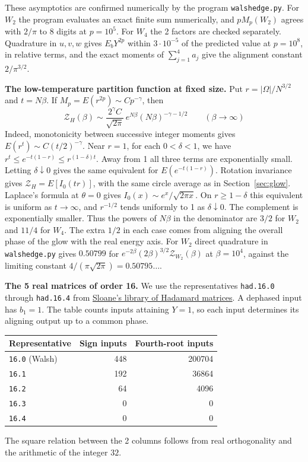 \documentclass[11pt,a4paper]{article}
\theoremstyle{remark}
\begin{document}
These asymptotics are confirmed numerically by the program
\texttt{walshedge.py}. For $W_2$ the program evaluates an exact finite sum numerically, and
$pM_p(W_2)$ agrees with $2/\pi$ to 8 digits at $p=10^5$. For $W_4$ the 2
factors are checked separately. Quadrature in $u,v,w$ gives
$E_bY^{2p}$ within $3\cdot10^{-5}$ of the predicted value at $p=10^8$, in
relative terms, and the exact moments of $\sum_{j=1}^4a_j$ give the
alignment constant $2/\pi^{3/2}$.

\medskip
\noindent\textbf{The low-temperature partition function at fixed size.}
Put $r=|\Omega|/N^{3/2}$ and $t=N\beta$. If $M_p=E(r^{2p})\sim C p^{-\gamma}$, then
\[
 \mathcal Z_H(\beta)\sim \frac{2^\gamma C}{\sqrt{2\pi}}\,
               e^{N\beta}(N\beta)^{-\gamma-1/2}
 \qquad(\beta\to\infty)
\]
Indeed, monotonicity between successive integer moments gives $E(r^t)\sim C(t/2)^{-\gamma}$. Near $r=1$, for each $0<\delta<1$, we have $r^t\le e^{-t(1-r)}\le r^{(1-\delta)t}$. Away from 1 all three terms are exponentially small. Letting $\delta\downarrow0$ gives the same equivalent for $E(e^{-t(1-r)})$. Rotation invariance gives $\mathcal Z_H=E[I_0(tr)]$, with the same circle average as in Section~\ref{sec:glow}. Laplace's formula at $\theta=0$ gives $I_0(x)\sim e^x/\sqrt{2\pi x}$. On $r\ge1-\delta$ this equivalent is uniform as $t\to\infty$, and $r^{-1/2}$ tends uniformly to 1 as $\delta\downarrow0$. The complement is exponentially smaller. Thus the powers of $N\beta$ in the denominator are $3/2$ for $W_2$ and $11/4$ for $W_4$. The extra $1/2$ in each case comes from aligning the overall phase of the glow with the real energy axis. For $W_2$ direct quadrature in \texttt{walshedge.py} gives $0.50799$ for $e^{-2\beta}(2\beta)^{3/2}\mathcal Z_{W_2}(\beta)$ at $\beta=10^4$, against the limiting constant $4/(\pi\sqrt{2\pi})=0.50795\ldots$.

\medskip
\noindent\textbf{The 5 real matrices of order 16.}
We use the representatives \texttt{had.16.0} through \texttt{had.16.4}
from \href{https://neilsloane.com/hadamard/index.html}{Sloane's library
of Hadamard matrices}. A dephased input has $b_1=1$. The table counts
inputs attaining $Y=1$, so each input determines its aligning output up
to a common phase.
\begin{center}
\begin{tabular}{lrr}
\toprule
Representative & Sign inputs & Fourth-root inputs\\
\midrule
\texttt{16.0} (Walsh) & 448 & 200704\\
\texttt{16.1} & 192 & 36864\\
\texttt{16.2} & 64 & 4096\\
\texttt{16.3} & 0 & 0\\
\texttt{16.4} & 0 & 0\\
\bottomrule
\end{tabular}
\end{center}
The square relation between the 2 columns follows from real
orthogonality and the arithmetic of the integer $32$.
\end{document}
